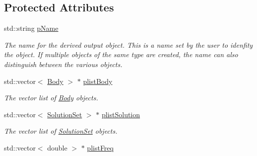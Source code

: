 \subsection*{Protected Attributes}
\begin{DoxyCompactItemize}
\item 
\hypertarget{classosea_1_1ofreq_1_1_output_derived_a4ab81d265885b1c9fb9b4596dc9cd093}{std\-::string \hyperlink{classosea_1_1ofreq_1_1_output_derived_a4ab81d265885b1c9fb9b4596dc9cd093}{p\-Name}}\label{classosea_1_1ofreq_1_1_output_derived_a4ab81d265885b1c9fb9b4596dc9cd093}

\begin{DoxyCompactList}\small\item\em The name for the derived output object. This is a name set by the user to idenfity the object. If multiple objects of the same type are created, the name can also distinguish between the various objects. \end{DoxyCompactList}\item 
\hypertarget{classosea_1_1ofreq_1_1_output_derived_ae1a331fca04d90685ab5a33670c90aeb}{std\-::vector$<$ \hyperlink{classosea_1_1ofreq_1_1_body}{Body} $>$ $\ast$ \hyperlink{classosea_1_1ofreq_1_1_output_derived_ae1a331fca04d90685ab5a33670c90aeb}{plist\-Body}}\label{classosea_1_1ofreq_1_1_output_derived_ae1a331fca04d90685ab5a33670c90aeb}

\begin{DoxyCompactList}\small\item\em The vector list of \hyperlink{classosea_1_1ofreq_1_1_body}{Body} objects. \end{DoxyCompactList}\item 
\hypertarget{classosea_1_1ofreq_1_1_output_derived_aeb19c45257cd6e4aac209bbeca5a7de0}{std\-::vector$<$ \hyperlink{classosea_1_1ofreq_1_1_solution_set}{Solution\-Set} $>$ $\ast$ \hyperlink{classosea_1_1ofreq_1_1_output_derived_aeb19c45257cd6e4aac209bbeca5a7de0}{plist\-Solution}}\label{classosea_1_1ofreq_1_1_output_derived_aeb19c45257cd6e4aac209bbeca5a7de0}

\begin{DoxyCompactList}\small\item\em The vector list of \hyperlink{classosea_1_1ofreq_1_1_solution_set}{Solution\-Set} objects. \end{DoxyCompactList}\item 
\hypertarget{classosea_1_1ofreq_1_1_output_derived_a5c5c94e05e212fad48aee82daed14738}{std\-::vector$<$ double $>$ $\ast$ \hyperlink{classosea_1_1ofreq_1_1_output_derived_a5c5c94e05e212fad48aee82daed14738}{plist\-Freq}}\label{classosea_1_1ofreq_1_1_output_derived_a5c5c94e05e212fad48aee82daed14738}


\end{DoxyCompactItemize}
